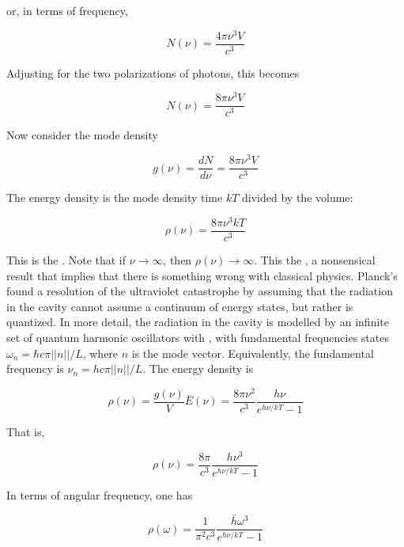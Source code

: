 or, in terms of frequency,

\begin{equation}
N(\nu) = \frac{4\pi\nu^3 V }{c^3}
\end{equation}


Adjusting for the two polarizations of photons, this becomes

\begin{equation}
N(\nu) = \frac{8\pi\nu^3 V }{c^3}
\end{equation}

Now consider the mode density

\begin{equation}
g(\nu) =\frac{ dN}{d\nu} =  \frac{8\pi\nu^3 V }{c^3}
\end{equation}

The energy density is the mode density time $kT$ divided by the volume:

\begin{equation}
\rho(\nu) = \frac{8\pi\nu^3 kT }{c^3}
\end{equation}


This is the .  Note that if $\nu \to \infty$, then
$\rho(\nu) \to \infty$.  This the , a nonsensical result that implies that there is something wrong with classical physics.  Planck's found a resolution of the ultraviolet catastrophe by assuming that the radiation in the cavity cannot assume a continuum of energy states, but rather is quantized.  In more detail, the radiation in the cavity is modelled by an infinite set of quantum harmonic oscillators with , with fundamental frequencies states $\omega_n = \hbar c\pi ||n||/L$, where $n$ is the mode vector.  Equivalently, the fundamental frequency is $\nu_n = h c\pi ||n||/L$.  The energy density is

\begin{equation}
\rho(\nu) = \frac{g(\nu)}{V}\bar E(\nu) 
  = \frac{8\pi\nu^2 }{c^3} \frac{h\nu}{e^{h\nu/kT} - 1}
\end{equation}


That is,

\begin{equation}
\rho(\nu) = \frac{8\pi }{c^3} \frac{h\nu^3}{e^{h\nu/kT} - 1}
\end{equation}

In terms of angular frequency, one has

\begin{equation}
\rho(\omega) = \frac{1}{\pi^2 c^3} \frac{\bar h\omega^3}{e^{h\nu/kT} - 1}
\end{equation}

